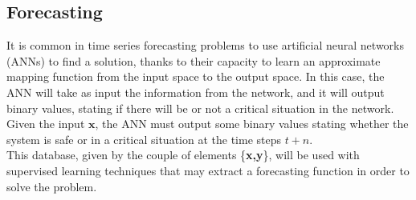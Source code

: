 \subsection{Forecasting}
It is common in time series forecasting problems to use artificial neural networks (\glspl{ANN}) to find a solution, thanks to their capacity to learn an approximate mapping function from the input space to the output space. In this case, the \gls{ANN} will take as input the information from the network, and it will output binary values, stating if there will be or not a critical situation in the network. \\

\noindent Given the input $\textbf{x}$, the \gls{ANN} must output some binary values stating whether the system is safe or in a critical situation at the time steps $t+n$. \\

This database, given by the couple of elements \{\textbf{x,y}\}, will be used with supervised learning techniques that may extract a forecasting function in order to solve the problem. \\




